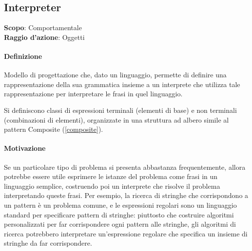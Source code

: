 \subsection{Interpreter}
\label{interpreter}

\textbf{Scopo}: Comportamentale \\
\textbf{Raggio d'azione}: Oggetti

\paragraph{Definizione} Modello di progettazione che, dato un linguaggio, permette di definire una rappresentazione della sua grammatica insieme a un interprete che utilizza tale rappresentazione per interpretare le frasi in quel linguaggio.

Si definiscono classi di espressioni terminali (elementi di base) e non terminali (combinazioni di elementi), organizzate in una struttura ad albero simile al pattern Composite (\ref{composite}).

\paragraph{Motivazione} Se un particolare tipo di problema si presenta abbastanza frequentemente, allora potrebbe essere utile esprimere le istanze del problema come frasi in un linguaggio semplice, costruendo poi un interprete che risolve il problema interpretando queste frasi. Per esempio, la ricerca di stringhe che corrispondono a un pattern è un problema comune, e le espressioni regolari sono un linguaggio standard per specificare pattern di stringhe: piuttosto che costruire algoritmi personalizzati per far corrispondere ogni pattern alle stringhe, gli algoritmi di ricerca potrebbero interpretare un'espressione regolare che specifica un insieme di stringhe da far corrispondere.

